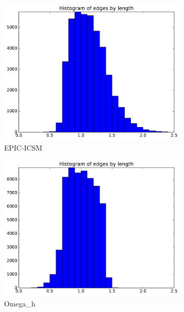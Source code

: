 \documentclass[3p,times,procedia,number]{elsarticle}
\begin{document}
\begin{figure}
\begin{subfigure}{.4\textwidth}
\includegraphics[width=\textwidth]{epic-icsm-cube-cylinder-polar-2-length.pdf}
\caption{EPIC-ICSM}
\end{subfigure}
\begin{subfigure}{.4\textwidth}
\centering
\includegraphics[width=\textwidth]{omega_h-cube-cylinder-polar-2-length.pdf}
\caption{Omega\_h}
\end{subfigure}
\begin{subfigure}{.4\textwidth}
\centering

\end{subfigure}
\end{figure}
\end{document}
